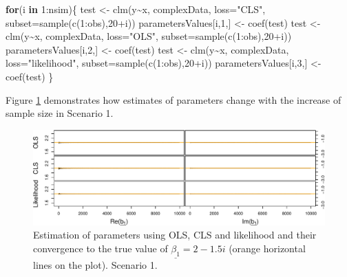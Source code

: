 \documentclass[
]{book}
\newenvironment{Shaded}{\begin{snugshade}}{\end{snugshade}}
\newcommand{\AttributeTok}[1]{\textcolor[rgb]{0.77,0.63,0.00}{#1}}
\newcommand{\ControlFlowTok}[1]{\textcolor[rgb]{0.13,0.29,0.53}{\textbf{#1}}}
\newcommand{\DecValTok}[1]{\textcolor[rgb]{0.00,0.00,0.81}{#1}}
\newcommand{\FunctionTok}[1]{\textcolor[rgb]{0.00,0.00,0.00}{#1}}
\newcommand{\NormalTok}[1]{#1}
\newcommand{\OtherTok}[1]{\textcolor[rgb]{0.56,0.35,0.01}{#1}}
\newcommand{\SpecialCharTok}[1]{\textcolor[rgb]{0.00,0.00,0.00}{#1}}
\newcommand{\StringTok}[1]{\textcolor[rgb]{0.31,0.60,0.02}{#1}}
\begin{document}
\begin{Shaded}
\begin{Highlighting}[]
\ControlFlowTok{for}\NormalTok{(i }\ControlFlowTok{in} \DecValTok{1}\SpecialCharTok{:}\NormalTok{nsim)\{}
\NormalTok{    test }\OtherTok{\textless{}{-}} \FunctionTok{clm}\NormalTok{(y}\SpecialCharTok{\textasciitilde{}}\NormalTok{x, complexData, }\AttributeTok{loss=}\StringTok{"CLS"}\NormalTok{,}
                \AttributeTok{subset=}\FunctionTok{sample}\NormalTok{(}\FunctionTok{c}\NormalTok{(}\DecValTok{1}\SpecialCharTok{:}\NormalTok{obs),}\DecValTok{20}\SpecialCharTok{+}\NormalTok{i))}
\NormalTok{    parametersValues[i,}\DecValTok{1}\NormalTok{,] }\OtherTok{\textless{}{-}} \FunctionTok{coef}\NormalTok{(test)}
\NormalTok{    test }\OtherTok{\textless{}{-}} \FunctionTok{clm}\NormalTok{(y}\SpecialCharTok{\textasciitilde{}}\NormalTok{x, complexData, }\AttributeTok{loss=}\StringTok{"OLS"}\NormalTok{,}
                \AttributeTok{subset=}\FunctionTok{sample}\NormalTok{(}\FunctionTok{c}\NormalTok{(}\DecValTok{1}\SpecialCharTok{:}\NormalTok{obs),}\DecValTok{20}\SpecialCharTok{+}\NormalTok{i))}
\NormalTok{    parametersValues[i,}\DecValTok{2}\NormalTok{,] }\OtherTok{\textless{}{-}} \FunctionTok{coef}\NormalTok{(test)}
\NormalTok{    test }\OtherTok{\textless{}{-}} \FunctionTok{clm}\NormalTok{(y}\SpecialCharTok{\textasciitilde{}}\NormalTok{x, complexData, }\AttributeTok{loss=}\StringTok{"likelihood"}\NormalTok{,}
                \AttributeTok{subset=}\FunctionTok{sample}\NormalTok{(}\FunctionTok{c}\NormalTok{(}\DecValTok{1}\SpecialCharTok{:}\NormalTok{obs),}\DecValTok{20}\SpecialCharTok{+}\NormalTok{i))}
\NormalTok{    parametersValues[i,}\DecValTok{3}\NormalTok{,] }\OtherTok{\textless{}{-}} \FunctionTok{coef}\NormalTok{(test)}
\NormalTok{\}}
\end{Highlighting}
\end{Shaded}

Figure \ref{fig:parametersUCDV} demonstrates how estimates of parameters change with the increase of sample size in Scenario 1.

\begin{figure}
\centering
\includegraphics{Svetunkov---Svetunkov---Complex-Dynamic-Models_files/figure-latex/parametersUCDV-1.pdf}
\caption{\label{fig:parametersUCDV}Estimation of parameters using OLS, CLS and likelihood and their convergence to the true value of \(\underline{\beta_1}=2-1.5i\) (orange horizontal lines on the plot). Scenario 1.}
\end{figure}
\end{document}

